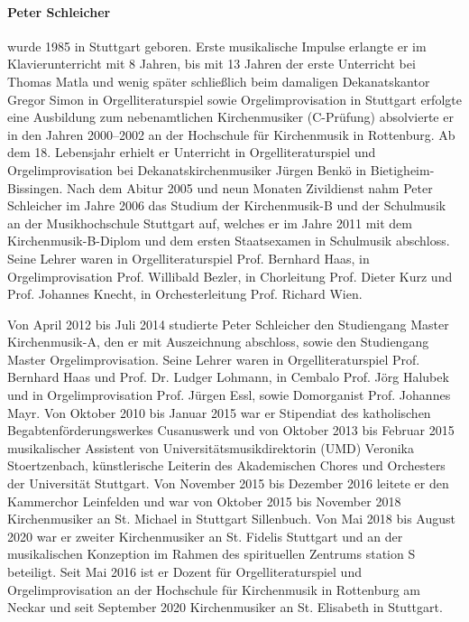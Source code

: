 \documentclass[a5paper,twoside,fontsize=10pt]{scrartcl}
\begin{document}
\paragraph{Peter Schleicher} wurde 1985 in Stuttgart geboren.
Erste musikalische Impulse erlangte er im Klavierunterricht mit 8 Jahren, bis mit 13 Jahren der erste Unterricht bei Thomas Matla und wenig später schließlich beim damaligen Dekanatskantor Gregor Simon in Orgelliteraturspiel sowie Orgelimprovisation in Stuttgart erfolgte eine Ausbildung zum nebenamtlichen Kirchenmusiker (C-Prüfung) absolvierte er in den Jahren 2000--2002 an der Hochschule für Kirchenmusik in Rottenburg.
Ab dem 18. Lebensjahr erhielt er Unterricht in Orgelliteraturspiel und Orgelimprovisation bei Dekanatskirchenmusiker Jürgen Benkö in Bietigheim-Bissingen.
Nach dem Abitur 2005 und neun Monaten Zivildienst nahm Peter Schleicher im Jahre 2006 das Studium der Kirchenmusik-B und der Schulmusik an der Musikhochschule Stuttgart auf, welches er im Jahre 2011 mit dem Kirchenmusik-B-Diplom und dem ersten Staatsexamen in Schulmusik abschloss.
Seine Lehrer waren in Orgelliteraturspiel Prof. Bernhard Haas, in Orgelimprovisation Prof. Willibald Bezler, in Chorleitung Prof. Dieter Kurz und Prof. Johannes Knecht, in Orchesterleitung Prof. Richard Wien.

Von April 2012 bis Juli 2014 studierte Peter Schleicher den Studiengang Master Kirchenmusik-A, den er mit Auszeichnung abschloss, sowie den Studiengang Master Orgelimprovisation.
Seine Lehrer waren in Orgelliteraturspiel Prof. Bernhard Haas und Prof. Dr. Ludger Lohmann, in Cembalo Prof. Jörg Halubek und in Orgelimprovisation Prof. Jürgen Essl, sowie Domorganist Prof. Johannes Mayr.
Von Oktober 2010 bis Januar 2015 war er Stipendiat des katholischen Begabtenförderungswerkes Cusanuswerk und von Oktober 2013 bis Februar 2015 musikalischer Assistent von Universitätsmusikdirektorin (UMD) Veronika Stoertzenbach, künstlerische Leiterin des Akademischen Chores und Orchesters der Universität Stuttgart.
Von November 2015 bis Dezember 2016 leitete er den Kammerchor Leinfelden und war von Oktober 2015 bis November 2018 Kirchenmusiker an St. Michael in Stuttgart Sillenbuch.
Von Mai 2018 bis August 2020 war er zweiter Kirchenmusiker an St. Fidelis Stuttgart und an der musikalischen Konzeption im Rahmen des spirituellen Zentrums station S beteiligt.
Seit Mai 2016 ist er Dozent für Orgelliteraturspiel und Orgelimprovisation an der Hochschule für Kirchenmusik in Rottenburg am Neckar und seit September 2020 Kirchenmusiker an St. Elisabeth in Stuttgart.
\end{document}
